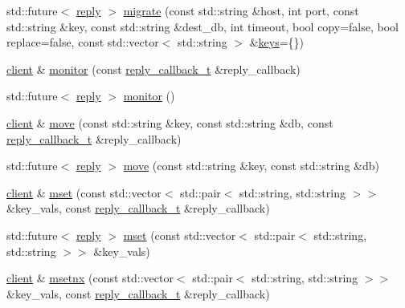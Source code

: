 \begin{DoxyCompactItemize}
std\+::future$<$ \hyperlink{classcpp__redis_1_1reply}{reply} $>$ \hyperlink{classcpp__redis_1_1client_a1bbf11a4ebd3dcf12d9846946e5c3545}{migrate} (const std\+::string \&host, int port, const std\+::string \&key, const std\+::string \&dest\+\_\+db, int timeout, bool copy=false, bool replace=false, const std\+::vector$<$ std\+::string $>$ \&\hyperlink{classcpp__redis_1_1client_acb7845a206b2321e6919c2f38282c322}{keys}=\{\})
\item 
\hyperlink{classcpp__redis_1_1client}{client} \& \hyperlink{classcpp__redis_1_1client_ad99627cb477d71f07fae0f88ed8ed85b}{monitor} (const \hyperlink{classcpp__redis_1_1client_a061a1140d36d2eaeda82b09a0bb3f9f2}{reply\+\_\+callback\+\_\+t} \&reply\+\_\+callback)
\item 
std\+::future$<$ \hyperlink{classcpp__redis_1_1reply}{reply} $>$ \hyperlink{classcpp__redis_1_1client_afd727179e9ee9348ced168a9ac70cbf7}{monitor} ()
\item 
\hyperlink{classcpp__redis_1_1client}{client} \& \hyperlink{classcpp__redis_1_1client_ad84393d728fb69b527a1d7b009270b58}{move} (const std\+::string \&key, const std\+::string \&db, const \hyperlink{classcpp__redis_1_1client_a061a1140d36d2eaeda82b09a0bb3f9f2}{reply\+\_\+callback\+\_\+t} \&reply\+\_\+callback)
\item 
std\+::future$<$ \hyperlink{classcpp__redis_1_1reply}{reply} $>$ \hyperlink{classcpp__redis_1_1client_ab50d18d50ac6d0bb7b91347c3a574960}{move} (const std\+::string \&key, const std\+::string \&db)
\item 
\hyperlink{classcpp__redis_1_1client}{client} \& \hyperlink{classcpp__redis_1_1client_acd9e2a69abc97bb7735425fdaebe788d}{mset} (const std\+::vector$<$ std\+::pair$<$ std\+::string, std\+::string $>$$>$ \&key\+\_\+vals, const \hyperlink{classcpp__redis_1_1client_a061a1140d36d2eaeda82b09a0bb3f9f2}{reply\+\_\+callback\+\_\+t} \&reply\+\_\+callback)
\item 
std\+::future$<$ \hyperlink{classcpp__redis_1_1reply}{reply} $>$ \hyperlink{classcpp__redis_1_1client_a369f84ea90c49095a3222d6f210410f8}{mset} (const std\+::vector$<$ std\+::pair$<$ std\+::string, std\+::string $>$$>$ \&key\+\_\+vals)
\item 
\hyperlink{classcpp__redis_1_1client}{client} \& \hyperlink{classcpp__redis_1_1client_ae04ade1f429088a437a4ea618a465a18}{msetnx} (const std\+::vector$<$ std\+::pair$<$ std\+::string, std\+::string $>$$>$ \&key\+\_\+vals, const \hyperlink{classcpp__redis_1_1client_a061a1140d36d2eaeda82b09a0bb3f9f2}{reply\+\_\+callback\+\_\+t} \&reply\+\_\+callback)
$$
\end{DoxyCompactItemize}

